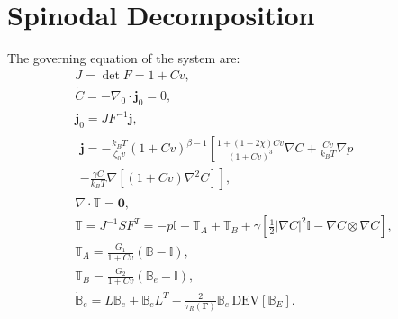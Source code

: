 \documentclass[12pt]{extarticle}
\newcommand{\B}{\ensuremath{\mathbb{B}}}
\begin{document}
\section{Spinodal Decomposition}
The governing equation of the system are:
\begin{gather}
J=\det F=1+Cv,\\
\dot{C} = -\nabla_0 \cdot \mathbf{j}_0 = 0,\\
\mathbf{j}_0= J F^{-1} \mathbf{j},\\[5mm]
\begin{aligned}
\mathbf{j} = -\frac{k_B T}{\zeta_0 v}\left(1+Cv\right)^{\beta-1}\left[ \frac{1+(1-2\chi)Cv}{(1+Cv)^3}\nabla C +\frac{Cv}{k_B T}\nabla p\right.\\
\left.- \frac{\gamma C}{k_BT}\nabla[(1+Cv)\nabla^2 C]\right],
\end{aligned}\\[5mm]
\nabla \cdot \mathbb{T} = \mathbf{0},\\[5mm]
\mathbb{T} = J^{-1} SF^T = -p \mathbb{I} +\mathbb{T}_A +\mathbb{T}_B + \gamma\left[\frac{1}{2} |\nabla C|^2\mathbb{I}-\nabla C \otimes \nabla C\right],\\[5mm]
\mathbb{T}_A=\frac{G_1}{1+Cv}(\B-\mathbb{I}),\\
\mathbb{T}_B=\frac{G_2}{1+Cv}(\B_e-\mathbb{I}),\\[5mm]
\dot{\B}_e= L \B_e +\B_e L^T - \frac{2}{\tau_R(\boldsymbol{\Gamma})} \B_e \,\text{DEV}[\B_E].
\end{gather}
\end{document}
